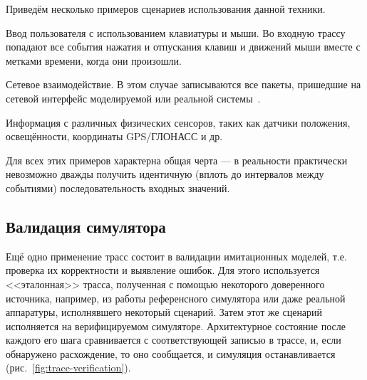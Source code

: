 Приведём несколько примеров сценариев использования данной техники.
\begin{itemize*}
    \item Ввод пользователя с использованием клавиатуры и мыши. Во входную трассу попадают все события нажатия и отпускания клавиш и движений мыши вместе с метками времени, когда они произошли.
    \item Сетевое взаимодействие. В этом случае записываются все пакеты, пришедшие на сетевой интерфейс моделируемой или реальной системы~\cite{network-simulation}.
    \item Информация с различных физических сенсоров, таких как датчики положения, освещённости, координаты GPS/ГЛОНАСС и др.
\end{itemize*}

Для всех этих примеров характерна общая черта --- в реальности практически невозможно дважды получить идентичную (вплоть до интервалов между событиями) последовательность входных значений. 

\subsection{Валидация симулятора}
Ещё одно применение трасс состоит в валидации имитационных моделей, т.е. проверка их корректности и выявление ошибок. Для этого используется <<эталонная>> трасса, полученная с помощью некоторого доверенного источника, например, из работы референсного симулятора или даже реальной аппаратуры, исполнявшего некоторый сценарий. Затем этот же сценарий исполняется на верифицируемом симуляторе. Архитектурное состояние после каждого его шага сравнивается с соответствующей записью в трассе, и, если обнаружено расхождение, то оно сообщается, и симуляция останавливается (рис.~\ref{fig:trace-verification}).

